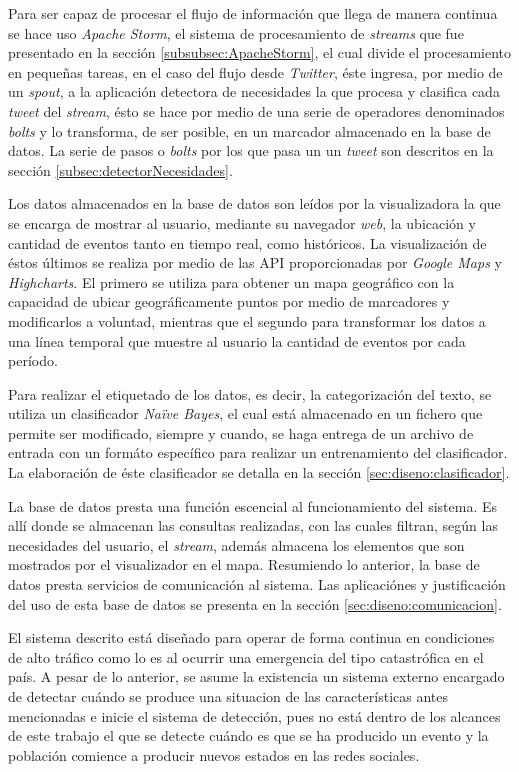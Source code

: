 Para ser capaz de procesar el flujo de información que llega de manera continua se hace uso \textit{Apache Storm}, el sistema de procesamiento de \textit{streams} que fue presentado en la sección \ref{subsubsec:ApacheStorm}, el cual divide el procesamiento en pequeñas tareas, en el caso del flujo desde \textit{Twitter}, éste ingresa, por medio de un \textit{spout}, a la aplicación detectora de necesidades la que procesa y clasifica cada \textit{tweet} del \textit{stream}, ésto se hace por medio de una serie de operadores denominados \textit{bolts} y lo transforma, de ser posible, en un marcador almacenado en la base de datos. La serie de pasos o \textit{bolts} por los que pasa un un \textit{tweet} son descritos en la sección \ref{subsec:detectorNecesidades}.

Los datos almacenados en la base de datos son leídos por la visualizadora la que se encarga de mostrar al usuario, mediante su navegador \textit{web}, la ubicación y cantidad de eventos tanto en tiempo real, como históricos. La visualización de éstos últimos se realiza por medio de las API proporcionadas por \textit{Google Maps} y \textit{Highcharts}. El primero se utiliza para obtener un mapa geográfico con la capacidad de ubicar geográficamente puntos por medio de marcadores y modificarlos a voluntad, mientras que el segundo para transformar los datos a una línea temporal que muestre al usuario la cantidad de eventos por cada período.

Para realizar el etiquetado de los datos, es decir, la categorización del texto, se utiliza un clasificador \textit{Naïve Bayes}, el cual está almacenado en un fichero que permite ser modificado, siempre y cuando, se haga entrega de un archivo de entrada con un formáto específico para realizar un entrenamiento del clasificador. La elaboración de éste clasificador se detalla en la sección \ref{sec:diseno:clasificador}.

La base de datos presta una función escencial al funcionamiento del sistema. Es allí donde se almacenan las consultas realizadas, con las cuales filtran, según las necesidades del usuario, el \textit{stream}, además almacena los elementos que son mostrados por el visualizador en el mapa. Resumiendo lo anterior, la base de datos presta servicios de comunicación al sistema. Las aplicaciónes y justificación del uso de esta base de datos se presenta en la sección \ref{sec:diseno:comunicacion}.

El sistema descrito está diseñado para operar de forma continua en condiciones de alto tráfico como lo es al ocurrir una emergencia del tipo catastrófica en el país. A pesar de lo anterior, se asume la existencia un sistema externo encargado de detectar cuándo se produce una situacion de las características antes mencionadas e inicie el sistema de detección, pues no está dentro de los alcances de este trabajo el que se detecte cuándo es que se ha producido un evento y la población comience a producir nuevos estados en las redes sociales.

